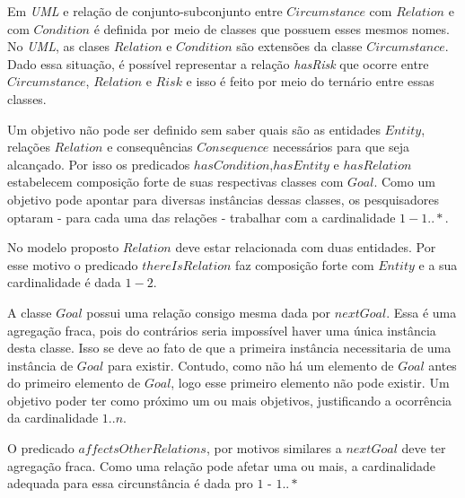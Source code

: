 Em \textit{UML} e relação de conjunto-subconjunto entre $Circumstance$ com $Relation$ e com $Condition$ é definida por meio de classes que possuem esses mesmos nomes. No \textit{UML}, as clases $Relation$ e $Condition$ são extensões da classe $Circumstance$. Dado essa situação, é possível representar a relação \textit{hasRisk} que ocorre entre $Circumstance$, $Relation$ e $Risk$ e isso é feito por meio do ternário entre essas classes. 

Um objetivo não pode ser definido sem saber quais são as entidades $Entity$, relações $Relation$ e consequências $Consequence$ necessários para que seja alcançado. Por isso os predicados $hasCondition$,$hasEntity$ e $hasRelation$ estabelecem composição forte de suas respectivas classes com $Goal$. Como um objetivo pode apontar para diversas instâncias dessas classes, os pesquisadores optaram - para cada uma das relações - trabalhar com a cardinalidade 
$1 - 1 .. *$.

No modelo proposto $Relation$ deve estar relacionada com duas entidades. Por esse motivo o predicado $thereIsRelation$ faz composição forte com $Entity$ e a sua cardinalidade é dada $1 - 2$. 

A classe $Goal$ possui uma relação consigo mesma dada por $nextGoal$. Essa é uma agregação fraca, pois do contrários seria impossível haver uma única instância desta classe. Isso se deve ao fato de que a primeira instância necessitaria de uma instância de $Goal$ para existir. Contudo, como não há um elemento de $Goal$ antes do primeiro elemento de $Goal$, logo esse primeiro elemento não pode existir. Um objetivo poder ter como próximo um ou mais objetivos, justificando a ocorrência da cardinalidade $1 .. n$. 

O predicado $affectsOtherRelations$, por motivos similares a $nextGoal$ deve ter agregação fraca. Como uma relação pode afetar uma ou mais, a cardinalidade adequada para essa circunstância é dada pro $1$ - $1 ..*$